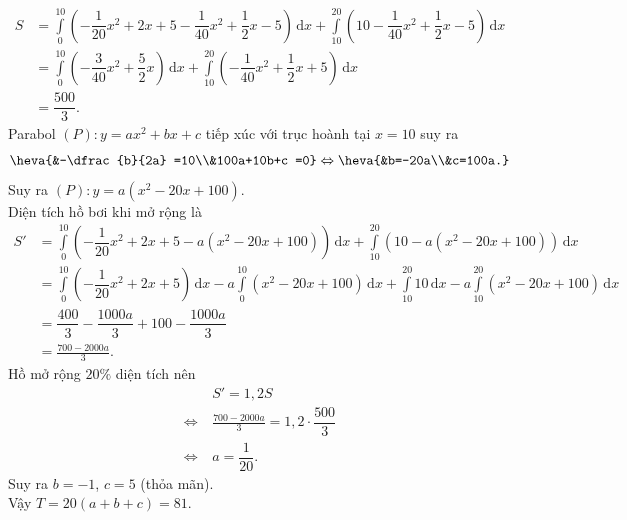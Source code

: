 \begin{ex}
{\begin{align*}
			S &= \int\limits_0^{10} \left ( -\dfrac{1}{20} x^2+2x+5 - \dfrac{1}{40} x^2+\dfrac{1}{2} x-5\right ) \mathrm{\,d}x + \int\limits_{10}^{20} \left ( 10 - \dfrac{1}{40} x^2+\dfrac{1}{2} x-5\right ) \mathrm{\,d}x  \\
			& =\int\limits_0^{10} \left ( -\dfrac{3}{40} x^2+\dfrac{5}{2}x \right ) \mathrm{\,d}x + \int\limits_{10}^{20} \left ( -\dfrac{1}{40} x^2+\dfrac{1}{2} x+5\right ) \mathrm{\,d}x  \\
			&= \dfrac{500}{3}.
		\end{align*}
		Parabol $(P) : y=ax^2+bx+c$ tiếp xúc với trục hoành tại $x=10$ suy ra 
		\[
		\heva{&-\dfrac{b}{2a} =10\\&100a+10b+c =0} \Leftrightarrow \heva{&b=-20a\\&c=100a.}
		\]
		Suy ra $(P) : y= a(x^2-20x+100)$. \\
		Diện tích hồ bơi khi mở rộng là
		\begin{align*}
			S'  &= \int\limits_0^{10} \left ( -\dfrac{1}{20} x^2+2x+5 - a(x^2-20x+100)\right ) \mathrm{\,d}x + \int\limits_{10}^{20} \left ( 10 - a(x^2-20x+100)\right ) \mathrm{\,d}x  \\
			& =\int\limits_{0}^{10} \left (  -\dfrac{1}{20} x^2+2x+5 \right ) \mathrm{\,d}x 
			- a\int\limits_0^{10} \left ( x^2-20x+100 \right ) \mathrm{\,d}x + \int\limits_{10}^{20} 10 \mathrm{\,d}x 
			- a\int\limits_{10}^{20}(x^2-20x+100)\mathrm{\,d}x  \\
			&= \dfrac{400}{3} - \dfrac{1000a}{3} + 100 - \dfrac{1000a}{3} \\
			&= \frac{700-2000 a}{3}.
		\end{align*}
		Hồ mở rộng $20\%$ diện tích nên
		\begin{align*}
			& S' = 1{,}2S \\
			\Leftrightarrow~& \frac{700-2000 a}{3}= 1{,}2 \cdot \dfrac{500}{3} \\
			\Leftrightarrow~& a= \dfrac{1}{20}.
		\end{align*}
		Suy ra $b=-1$, $c=5$ (thỏa mãn). \\
		Vậy $T= 20(a+b+c) =81$.
	}
\end{ex}

